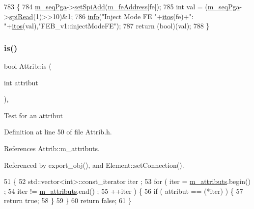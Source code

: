 \begin{DoxyCode}
783                                  \{
784   \hyperlink{classFEB__v1_a6c7804ac86796f233a8393043adf2e77}{m\_seqPga}->\hyperlink{classSeqPGA_ac998ce3a6d9b5f2e88cc8393f8c1df53}{setSpiAdd}(\hyperlink{classFEB__v1_a4e1945c2d5b434125f375e9d0fc6d99f}{m\_feAddress}[fe]);
785   \textcolor{keywordtype}{int} val = (\hyperlink{classFEB__v1_a6c7804ac86796f233a8393043adf2e77}{m\_seqPga}->\hyperlink{classSeqPGA_ab3d0e5e5d4014bc7a92588a76b8713d4}{spiRead}(1)>>10)&1;
786   \hyperlink{classObject_a644fd329ea4cb85f54fa6846484b84a8}{info}(\textcolor{stringliteral}{"Inject Mode FE "}+\hyperlink{Tools_8h_af330027dbdafb9a30768b3613c553e60}{itos}(fe)+\textcolor{stringliteral}{": "}+\hyperlink{Tools_8h_af330027dbdafb9a30768b3613c553e60}{itos}(val),\textcolor{stringliteral}{"FEB\_v1::injectModeFE"});
787   \textcolor{keywordflow}{return} (\textcolor{keywordtype}{bool})(val);
788 \}
\end{DoxyCode}
\mbox{\label{classAttrib_a704f26af560909ad22065083bb7d4c34}} 
\subsubsection{\texorpdfstring{is()}{is()}}
{\footnotesize\ttfamily bool Attrib\+::is (\begin{DoxyParamCaption}\item[{int}]{attribut }\end{DoxyParamCaption})\hspace{0.3cm}{\ttfamily [inline]}, {\ttfamily [inherited]}}

Test for an attribut 

Definition at line 50 of file Attrib.\+h.



References Attrib\+::m\+\_\+attributs.



Referenced by export\+\_\+obj(), and Element\+::set\+Connection().


\begin{DoxyCode}
51   \{
52     std::vector<int>::const\_iterator iter ;
53     \textcolor{keywordflow}{for} ( iter  = \hyperlink{classAttrib_ac4bd58a0cc6b38a3b711d609a3d3aacc}{m\_attributs}.begin() ;
54           iter != \hyperlink{classAttrib_ac4bd58a0cc6b38a3b711d609a3d3aacc}{m\_attributs}.end()   ;
55           ++iter ) \{
56       \textcolor{keywordflow}{if} ( attribut == (*iter) ) \{
57         \textcolor{keywordflow}{return} \textcolor{keyword}{true};
58       \}
59     \}
60     \textcolor{keywordflow}{return} \textcolor{keyword}{false};
61   \}
\end{DoxyCode}
\mbox{\label{classFEB__v1_a68050d232efd8d6568910b09a2c18f62}} 
